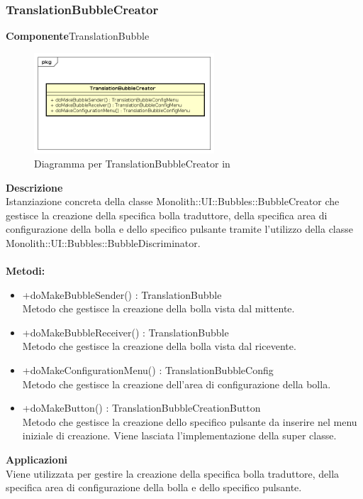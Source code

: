 \subsubsection{TranslationBubbleCreator}
\textbf{Componente}TranslationBubble\\
   \FloatBarrier
   \begin{figure}[ht]
   \centering
   \includegraphics[width=0.6\textwidth]{img/single-TranslationBubbleCreator}
   \caption{{Diagramma per TranslationBubbleCreator in }}
\end{figure}
\FloatBarrier
\textbf{Descrizione}\\
Istanziazione concreta della classe Monolith::UI::Bubbles::BubbleCreator che gestisce la creazione della specifica bolla traduttore, della specifica area di configurazione della bolla e dello specifico pulsante tramite l'utilizzo della classe Monolith::UI::Bubbles::BubbleDiscriminator.
\\
\\
\textbf{Metodi:} 
\begin{itemize}
\item +doMakeBubbleSender() : TranslationBubble 
\\
Metodo che gestisce la creazione della bolla vista dal mittente.
\item +doMakeBubbleReceiver() : TranslationBubble 
\\
Metodo che gestisce la creazione della bolla vista dal ricevente.
\item +doMakeConfigurationMenu() : TranslationBubbleConfig 
\\
Metodo che gestisce la creazione dell'area di configurazione della bolla.
\item +doMakeButton() : TranslationBubbleCreationButton 
\\
Metodo che gestisce la creazione dello specifico pulsante da inserire nel menu iniziale di creazione. Viene lasciata l'implementazione della super classe.
\end{itemize} 


\textbf{Applicazioni}\\
Viene utilizzata per gestire la creazione della specifica bolla traduttore, della specifica area di configurazione della bolla e dello specifico pulsante. 


